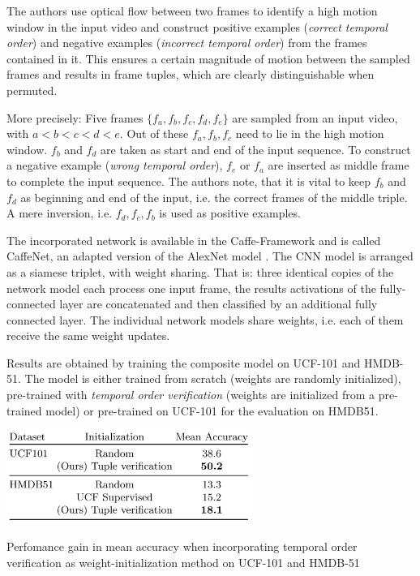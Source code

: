 The authors use optical flow between two frames \cite{farneback_two-frame_2003} to identify a high motion window in the input video and construct positive examples (\textit{correct temporal order}) and negative examples (\textit{incorrect temporal order}) from the frames contained in it.
This ensures a certain magnitude of motion between the sampled frames and results in frame tuples, which are clearly distinguishable when permuted.

More precisely: Five frames $\{f_a, f_b, f_c, f_d, f_e\}$ are sampled from an input video, with $a < b < c < d < e$.
Out of these $f_a, f_b, f_c$ need to lie in the high motion window.
$f_b$ and $f_d$ are taken as start and end of the input sequence.
To construct a negative example (\textit{wrong temporal order}), $f_e$ or $f_a$ are inserted as middle frame to complete the input sequence.
The authors note, that it is vital to keep $f_b$ and $f_d$ as beginning and end of the input, i.e. the correct frames of the middle triple.
A mere inversion, i.e. $f_d, f_c, f_b$ is used as positive examples.

The incorporated network is available in the Caffe-Framework \cite{jia_caffe:_2014-1} and is called CaffeNet, an adapted version of the AlexNet model \cite{krizhevsky_imagenet_2012-1}.
The CNN model is arranged as a siamese triplet, with weight sharing.
That is: three identical copies of the network model each process one input frame, the results activations of the fully-connected layer are concatenated and then classified by an additional fully connected layer.
The individual network models share weights, i.e. each of them receive the same weight updates.

Results are obtained by training the composite model on UCF-101 and HMDB-51.
The model is either trained from scratch (weights are randomly initialized), pre-trained with \textit{temporal order verification} (weights are initialized from a pre-trained model) or pre-trained on UCF-101 for the evaluation on HMDB51.

\begin{table}[H]
    \centering
    \includegraphics[width=0.6\textwidth]{img_related/shufflelearn_results}
    \caption{Perfomance gain in mean accuracy when incorporating temporal order verification as weight-initialization method on UCF-101 and HMDB-51 \cite{misra_shuffle_2016}}
    \label{tab:shufflelearn_results}
\end{table}


